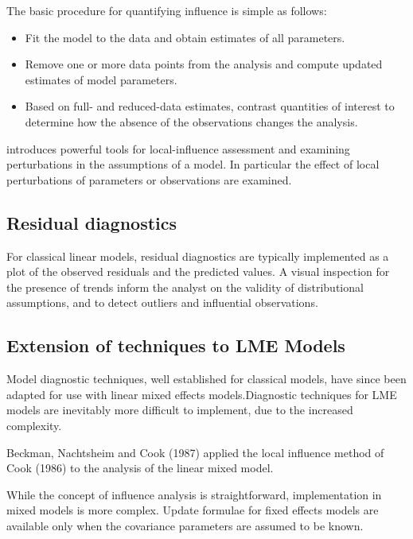 \documentclass[Main.tex]{subfiles}
\begin{document}
	The basic procedure for quantifying influence is simple as follows:
	
	\begin{itemize}
		\item Fit the model to the data and obtain estimates of all parameters.
		\item Remove one or more data points from the analysis and compute updated estimates of model parameters.
		\item Based on full- and reduced-data estimates, contrast quantities of interest to determine how the absence of the observations changes the analysis.
	\end{itemize}
	
	\citet{cook86} introduces powerful tools for local-influence assessment and examining perturbations in the assumptions of a model. In particular the effect of local perturbations of parameters or observations are examined.
	
	
	





\newpage
\subsection{Residual diagnostics} %
For classical linear models, residual diagnostics are typically implemented as a plot of the observed residuals and the predicted values. A visual inspection for the presence of trends inform the analyst on the validity of distributional assumptions, and to detect outliers and influential observations.

\newpage
\subsection*{Extension of techniques to LME Models} %

Model diagnostic techniques, well established for classical models, have since been adapted for use with linear mixed effects models.Diagnostic techniques for LME models are inevitably more difficult to implement, due to the increased complexity.

Beckman, Nachtsheim and Cook (1987)  applied the local influence method of Cook (1986) to the analysis of the linear mixed model.

While the concept of influence analysis is straightforward, implementation in mixed models is more complex. Update formulae for fixed effects models are available only when the covariance parameters are assumed to be known.
\end{document}
